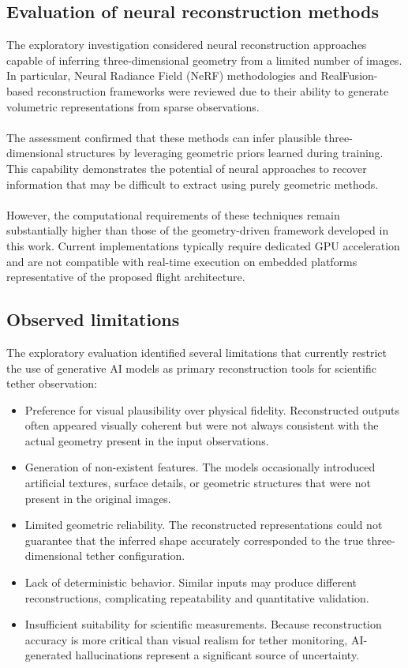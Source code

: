 \subsection{Evaluation of neural reconstruction methods}

The exploratory investigation considered neural reconstruction approaches capable of inferring three-dimensional geometry from a limited number of images. In particular, Neural Radiance Field (NeRF) methodologies and RealFusion-based reconstruction frameworks were reviewed due to their ability to generate volumetric representations from sparse observations.
\\\\
The assessment confirmed that these methods can infer plausible three-dimensional structures by leveraging geometric priors learned during training. This capability demonstrates the potential of neural approaches to recover information that may be difficult to extract using purely geometric methods.
\\\\
However, the computational requirements of these techniques remain substantially higher than those of the geometry-driven framework developed in this work. Current implementations typically require dedicated GPU acceleration and are not compatible with real-time execution on embedded platforms representative of the proposed flight architecture.

\subsection{Observed limitations}

The exploratory evaluation identified several limitations that currently restrict the use of generative AI models as primary reconstruction tools for scientific tether observation:

\begin{itemize}
    \item Preference for visual plausibility over physical fidelity. Reconstructed outputs often appeared visually coherent but were not always consistent with the actual geometry present in the input observations.
    \item Generation of non-existent features. The models occasionally introduced artificial textures, surface details, or geometric structures that were not present in the original images.
    \item Limited geometric reliability. The reconstructed representations could not guarantee that the inferred shape accurately corresponded to the true three-dimensional tether configuration.
    \item Lack of deterministic behavior. Similar inputs may produce different reconstructions, complicating repeatability and quantitative validation.
    \item Insufficient suitability for scientific measurements. Because reconstruction accuracy is more critical than visual realism for tether monitoring, AI-generated hallucinations represent a significant source of uncertainty.
\end{itemize}

